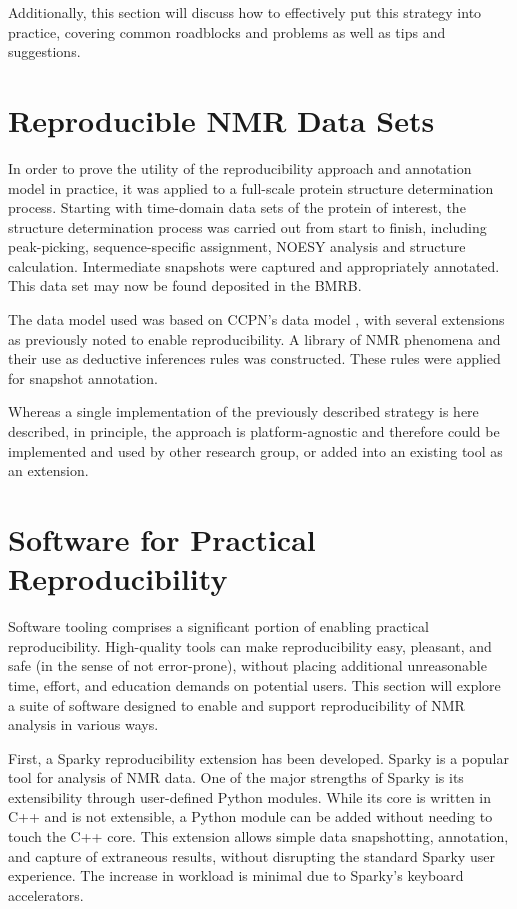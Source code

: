 Additionally, this section will discuss how to effectively put this strategy 
into practice, covering common roadblocks and problems as well as tips and 
suggestions.


\section{Reproducible NMR Data Sets}
In order to prove the utility of the reproducibility approach and annotation 
model in practice, it was applied to a full-scale protein structure 
determination process.  Starting with time-domain data sets of the protein of 
interest, the structure determination process was carried out from start to 
finish, including peak-picking, sequence-specific assignment, NOESY analysis 
and structure calculation.  Intermediate snapshots were captured and 
appropriately annotated.  This data set may now be found deposited in the BMRB.

The data model used was based on CCPN's data model \cite{ccpn}, with several 
extensions as previously noted to enable reproducibility.  A library of NMR 
phenomena and their use as deductive inferences rules was constructed.  
These rules were applied for snapshot annotation.

Whereas a single implementation of the previously described strategy is 
here described, in principle, the approach is platform-agnostic and 
therefore could be implemented and used by other research group, or added 
into an existing tool as an extension.


\section{Software for Practical Reproducibility}
Software tooling comprises a significant portion of enabling practical 
reproducibility.  High-quality tools can make reproducibility easy, pleasant, 
and safe (in the sense of not error-prone), without placing additional 
unreasonable time, effort, and education demands on potential users.  This 
section will explore a suite of software designed to enable and support 
reproducibility of NMR analysis in various ways.
	
First, a Sparky reproducibility extension has been developed.  Sparky 
\cite{sparky} is a popular tool for analysis of NMR data.  One of the major 
strengths of Sparky is its extensibility through user-defined Python modules.  
While its core is written in C++ and is not extensible, a Python module can 
be added without needing to touch the C++ core.  This extension allows
simple data snapshotting, annotation, and capture of extraneous results,
without disrupting the standard Sparky user experience.  The increase in
workload is minimal due to Sparky's keyboard accelerators.

